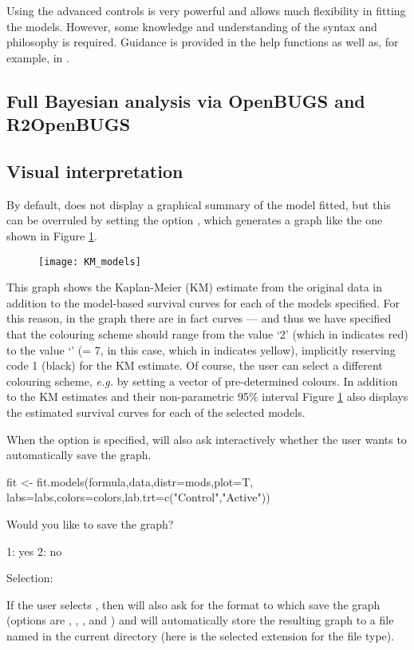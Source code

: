 \documentclass[article,nojss]{jss}
\newcommand{\eg}{{\em e.g.\/}\xspace}
\newcommand{\R}{\proglang{R}\xspace}
\newcommand{\sh}{\proglang{survHE}\xspace}
\newcommand{\INLA}{\proglang{INLA}\xspace}
\begin{document}
Using the \INLA advanced controls is very powerful and allows much flexibility in fitting the models. However, some knowledge and understanding of the \INLA syntax and philosophy is required. Guidance is provided in the \INLA help functions as well as, for example, in \cite{Rueetal:2008,Blangiardoetal:2013,BlangiardoCameletti:2015}.

\subsection{Full Bayesian analysis via OpenBUGS and R2OpenBUGS}\label{model_bugs}

\subsection{Visual interpretation}
By default,  does not display a graphical summary of the model fitted, but this can be overruled by setting the option , which generates a graph like the one shown in Figure \ref{KM_models}.
\begin{figure}[!h]
\centering
\texttt{[image: KM\_models]}
\caption{}\label{KM_models}
\end{figure}

This graph shows the Kaplan-Meier (KM) estimate from the original data in addition to the model-based survival curves for each of the models specified. For this reason, in the graph there are in fact  curves --- and thus we have specified that the colouring scheme should range from the value `2' (which in \R indicates red) to the value `' (= 7, in this case, which in \R indicates yellow), implicitly reserving code 1 (black) for the KM estimate. Of course, the user can select a different colouring scheme, \eg by setting a vector of pre-determined colours. In addition to the KM estimates and their non-parametric 95\% interval Figure \ref{KM_models} also displays the estimated survival curves for each of the selected models. 

When the option  is specified,  will also ask interactively whether the user wants to automatically save the graph. 
\begin{CodeInput}
fit <- fit.models(formula,data,distr=mods,plot=T,
	labs=labs,colors=colors,lab.trt=c("Control","Active"))
\end{CodeInput}
\begin{CodeOutput}
Would you like to save the graph? 

1: yes
2: no

Selection:
\end{CodeOutput}
If the user selects , then \sh will also ask for the format to which save the graph (options are , , ,  and ) and will automatically store the resulting graph to a file named  in the current directory (here  is the selected extension for the file type).
\end{document}

